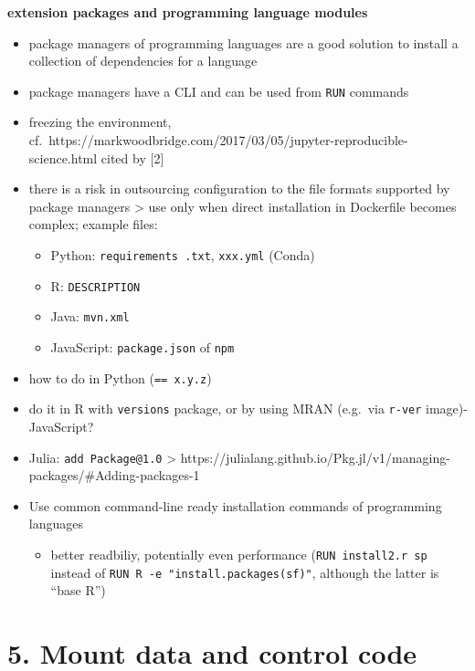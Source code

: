 \documentclass[10pt,letterpaper]{article}
\providecommand{\tightlist}{%
  \setlength{\itemsep}{0pt}\setlength{\parskip}{0pt}}
\begin{document}
\textbf{extension packages and programming language modules}

\begin{itemize}
\tightlist
\item
  package managers of programming languages are a good solution to
  install a collection of dependencies for a language
\item
  package managers have a CLI and can be used from \texttt{RUN} commands
\item
  freezing the environment,
  cf.~https://markwoodbridge.com/2017/03/05/jupyter-reproducible-science.html
  cited by {[}2{]}
\item
  there is a risk in outsourcing configuration to the file formats
  supported by package managers \textgreater{} use only when direct
  installation in Dockerfile becomes complex; example files:

  \begin{itemize}
  \tightlist
  \item
    Python: \texttt{requirements\ .txt}, \texttt{xxx.yml} (Conda)
  \item
    R: \texttt{DESCRIPTION}
  \item
    Java: \texttt{mvn.xml}
  \item
    JavaScript: \texttt{package.json} of \texttt{npm}
  \end{itemize}
\item
  how to do in Python (\texttt{==\ x.y.z})
\item
  do it in R with \texttt{versions} package, or by using MRAN (e.g.~via
  \texttt{r-ver} image)- JavaScript?
\item
  Julia: \texttt{add\ Package@1.0} \textgreater{}
  https://julialang.github.io/Pkg.jl/v1/managing-packages/\#Adding-packages-1
\item
  Use common command-line ready installation commands of programming
  languages

  \begin{itemize}
  \tightlist
  \item
    better readbiliy, potentially even performance
    (\texttt{RUN\ install2.r\ sp} instead of
    \texttt{RUN\ R\ -e\ "install.packages(\textquotesingle{}sf\textquotesingle{})"},
    although the latter is ``base R'')
  \end{itemize}
\end{itemize}

\hypertarget{mount-data-and-control-code}{%
\section*{5. Mount data and control
code}\label{mount-data-and-control-code}}
\end{document}
